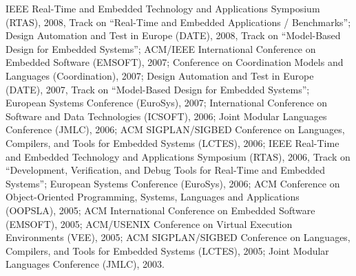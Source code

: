 {\begin{itemize}
IEEE Real-Time and Embedded Technology and Applications Symposium (RTAS), 2008, Track on ``Real-Time and Embedded Applications / Benchmarks'';
Design Automation and Test in Europe (DATE), 2008, Track on ``Model-Based Design for Embedded Systems'';
ACM/IEEE International Conference on Embedded Software (EMSOFT), 2007;
Conference on Coordination Models and Languages (Coordination), 2007;
Design Automation and Test in Europe (DATE), 2007, Track on ``Model-Based Design for Embedded Systems'';
European Systems Conference (EuroSys), 2007;
International Conference on Software and Data Technologies (ICSOFT), 2006;
Joint Modular Languages Conference (JMLC), 2006;
ACM SIGPLAN/SIGBED Conference on Languages, Compilers, and Tools for Embedded Systems (LCTES), 2006;
IEEE Real-Time and Embedded Technology and Applications Symposium (RTAS), 2006, Track on ``Development, Verification, and Debug Tools for Real-Time and Embedded Systems'';
European Systems Conference (EuroSys), 2006;
ACM Conference on Object-Oriented Programming, Systems, Languages and Applications (OOPSLA), 2005;
ACM International Conference on Embedded Software (EMSOFT), 2005;
ACM/USENIX Conference on Virtual Execution Environments (VEE), 2005;
ACM SIGPLAN/SIGBED Conference on Languages, Compilers, and Tools for Embedded Systems (LCTES), 2005;
Joint Modular Languages Conference (JMLC), 2003.
\end{itemize}
}



